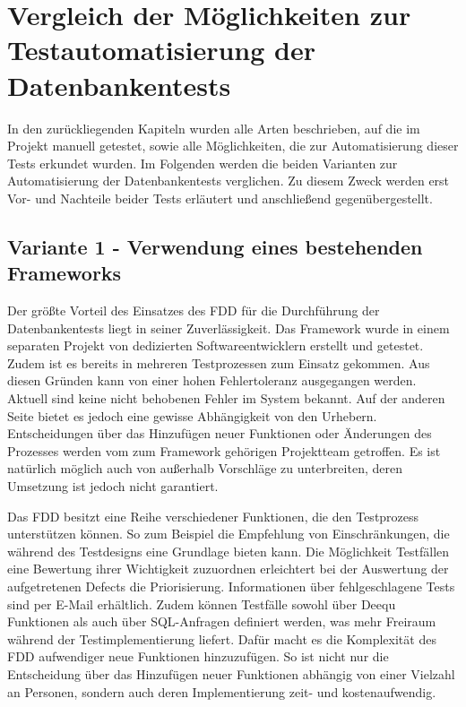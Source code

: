\chapter{Vergleich der Möglichkeiten zur Testautomatisierung der Datenbankentests}
\nocite{*}
In den zurückliegenden Kapiteln wurden alle Arten beschrieben, auf die im Projekt manuell getestet, sowie alle Möglichkeiten, die zur Automatisierung dieser Tests erkundet wurden.
Im Folgenden werden die beiden Varianten zur Automatisierung der Datenbankentests verglichen. Zu diesem Zweck werden erst Vor- und Nachteile beider Tests erläutert und anschließend gegenübergestellt.

\section{Variante 1 - Verwendung eines bestehenden Frameworks}
Der größte Vorteil des Einsatzes des \ac{FDD} für die Durchführung der Datenbankentests liegt in seiner Zuverlässigkeit. Das Framework wurde in einem separaten Projekt von dedizierten Softwareentwicklern erstellt und getestet. Zudem ist es bereits in mehreren Testprozessen zum Einsatz gekommen. Aus diesen Gründen kann von einer hohen Fehlertoleranz ausgegangen werden. Aktuell sind keine nicht behobenen Fehler im System bekannt. Auf der anderen Seite bietet es jedoch eine gewisse Abhängigkeit von den Urhebern. Entscheidungen über das Hinzufügen neuer Funktionen oder Änderungen des Prozesses werden vom zum Framework gehörigen Projektteam getroffen. Es ist natürlich möglich auch von außerhalb Vorschläge zu unterbreiten, deren Umsetzung ist jedoch nicht garantiert.
\newline


Das \ac{FDD} besitzt eine Reihe verschiedener Funktionen, die den Testprozess unterstützen können. So zum Beispiel die Empfehlung von Einschränkungen, die während des Testdesigns eine Grundlage bieten kann. Die Möglichkeit Testfällen eine Bewertung ihrer Wichtigkeit zuzuordnen erleichtert bei der Auswertung der aufgetretenen Defects die Priorisierung. Informationen über fehlgeschlagene Tests sind per E-Mail erhältlich. Zudem können Testfälle sowohl über Deequ Funktionen als auch über SQL-Anfragen definiert werden, was mehr Freiraum während der Testimplementierung liefert. Dafür macht es die Komplexität des \ac{FDD} aufwendiger neue Funktionen hinzuzufügen. So ist nicht nur die Entscheidung über das Hinzufügen neuer Funktionen abhängig von einer Vielzahl an Personen, sondern auch deren Implementierung zeit- und kostenaufwendig.
\newline


